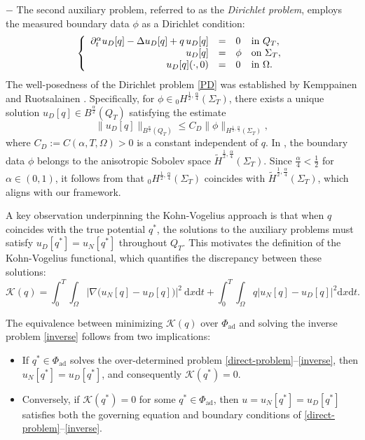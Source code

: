 \documentclass[a4paper,12pt,reqno,natbib]{amsart}
\newcommand{\dx} {\displaystyle\mathrm{d}x}
\newcommand{\dt} {\displaystyle\mathrm{d}t}
\begin{document}
\noindent $-$ The second auxiliary problem, referred to as the \emph{Dirichlet problem}, employs the measured boundary data $\phi$ as a Dirichlet condition:
\begin{eqnarray} \label{PD}
\left\{
  \begin{array}{rcll}
     \partial_{t} ^{\alpha}  u_D[q]-\Delta  u_D[q] +q\, u_D[q]&=&0&\hbox{in}\ Q_T, \\
    u_D[q]&=&\phi &\hbox{on}\  \Sigma_T, \\
   u_D[q](\cdot,0)&=&0  &\hbox{in}\ \Omega.
  \end{array}
\right.
\end{eqnarray}
The well-posedness of the Dirichlet problem \eqref{PD} was established by Kemppainen and Ruotsalainen \cite[Corollary 3.6]{kemppainen2009boundary}. Specifically, for $\phi \in {}_0H^{\frac{1}{2},\frac{\alpha}{4}}(\Sigma_{T})$, there exists a unique solution $u_D[q] \in B^{\frac{\alpha}{2}}(Q_T)$ satisfying the estimate
\begin{equation} \label{estimate-Direchlet}
    \| u_D[q] \|_{B^{\frac{\alpha}{2}}(Q_T)} \leq C_D \|\phi\|_{H^{\frac{1}{2}, \frac{\alpha}{4}}(\Sigma_T)},
\end{equation}
where $C_D := C(\alpha, T, \Omega) > 0$ is a constant independent of $q$. In \cite[Corollary 3.6]{kemppainen2009boundary}, the boundary data $\phi$ belongs to the anisotropic Sobolev space $\widetilde{H}^{\frac{1}{2},\frac{\alpha}{4}}(\Sigma_{T})$. Since $\frac{\alpha}{4} < \frac{1}{2}$ for $\alpha \in (0,1)$, it follows from \cite{lions2012non} that ${}_0H^{\frac{1}{2},\frac{\alpha}{4}}(\Sigma_{T})$ coincides with $\widetilde{H}^{\frac{1}{2},\frac{\alpha}{4}}(\Sigma_{T})$, which aligns with our framework.




A key observation underpinning the Kohn-Vogelius approach is that when $q$ coincides with the true potential $q^*$, the solutions to the auxiliary problems must satisfy $u_D[q^*] = u_N[q^*]$ throughout $Q_T$. This motivates the definition of the Kohn-Vogelius functional, which quantifies the discrepancy between these solutions:
\begin{equation}\label{dstance}
   \mathcal{K}( q)=\int_0^T \int_{\Omega}\Big|\nabla\Big(
 u_N[q]- u_D[q]\Big)\Big|^2\ \dx \dt +\int_0^T\int_{\Omega}q\Big| u_N[q]- u_D[q]\Big|^2 \dx \dt.
\end{equation}


The equivalence between minimizing $\mathcal{K}(q)$ over $\Phi_{\text{ad}}$ and solving the inverse problem \eqref{inverse} follows from two implications:
\begin{itemize}
    \item[$-$] If $q^* \in \Phi_{\text{ad}}$ solves the over-determined problem \eqref{direct-problem}--\eqref{inverse}, then $u_N[q^*] = u_D[q^*]$, and consequently $\mathcal{K}(q^*) = 0$.
    \item[$-$] Conversely, if $\mathcal{K}(q^*) = 0$ for some $q^* \in \Phi_{\text{ad}}$, then $u = u_N[q^*] = u_D[q^*]$ satisfies both the governing equation and boundary conditions of \eqref{direct-problem}--\eqref{inverse}.
\end{itemize}
\end{document}
